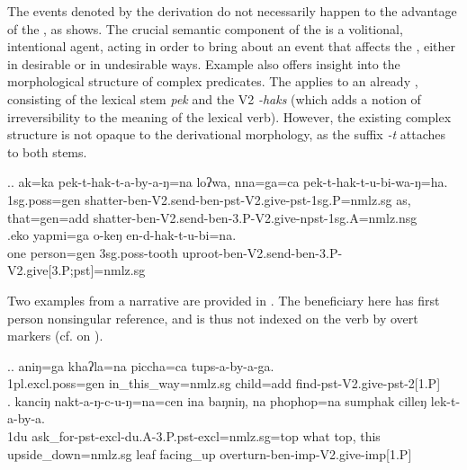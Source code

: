 The events denoted by the  derivation do not necessarily happen to the advantage of the , as \Next shows. The crucial semantic component of the  is a volitional, intentional agent, acting in order to bring about an event that affects the , either in desirable or in undesirable ways. Example \Next also offers insight into the morphological structure of complex predicates. The  applies to an already , consisting of the lexical stem \emph{pek}  and the V2 \emph{-haks}  (which adds a notion of irreversibility to the meaning of the lexical verb). However, the existing complex structure is not opaque to the derivational morphology, as the  suffix \emph{-t} attaches to both stems.

\ex.\ag. ak=ka pek-t-hak-t-a-by-a-ŋ=na loʔwa, nna=ga=ca  pek-t-hak-t-u-bi-wa-ŋ=ha.\\
{\sc 1sg.poss=gen} shatter-{\sc ben-V2.send-ben-pst-V2.give-pst-1sg.P=nmlz.sg} as,   that{\sc =gen=add} shatter-{\sc ben-V2.send-ben-3.P-V2.give-npst-1sg.A=nmlz.nsg}\\
 
\bg.eko yapmi=ga o-keŋ en-d-hak-t-u-bi=na.\\
one person{\sc =gen} {\sc 3sg.poss-}tooth	uproot{\sc -ben-V2.send-ben-3.P-V2.give[3.P;pst]=nmlz.sg}\\
 

Two examples from a narrative are provided in \Next. The beneficiary here has first person nonsingular reference, and is thus not indexed on the verb by overt markers (cf.  on ).

\ex.\ag. aniŋ=ga          khaʔla=na   piccha=ca    tups-a-by-a-ga.\\
	{\sc 1pl.excl.poss=gen} in\_this\_way{\sc =nmlz.sg} child{\sc =add} find{\sc -pst-V2.give-pst-2[1.P]}\\
 
\bg. kanciŋ nakt-a-ŋ-c-u-ŋ=na=cen ina baŋniŋ, na phophop=na sumphak cilleŋ  lek-t-a-by-a.\\
 {\sc 1du} ask\_for{\sc -pst-excl-du.A-3.P.pst-excl=nmlz.sg=top} what  {\sc top}, this upside\_down{\sc =nmlz.sg} leaf    facing\_up overturn{\sc -ben-imp-V2.give-imp[1.P]}\\


